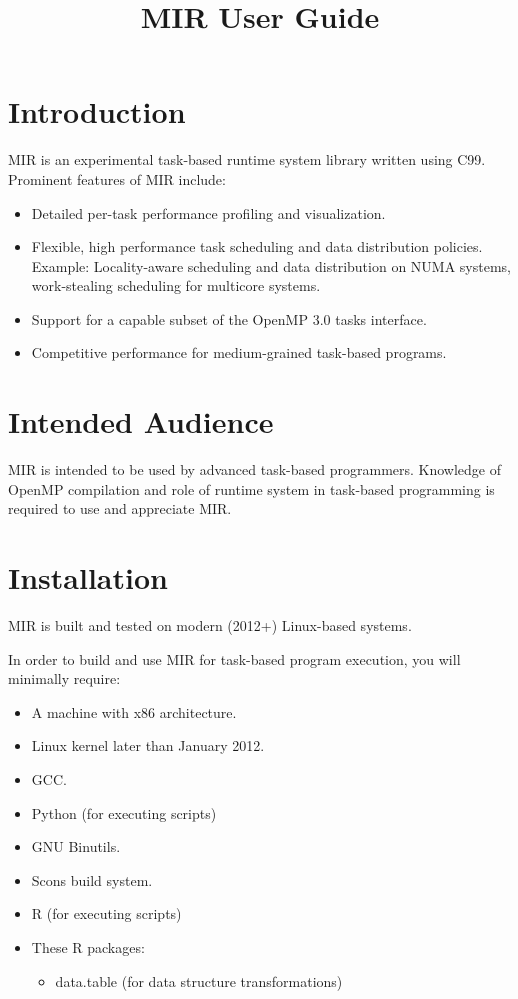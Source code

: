 \documentclass[11pt,a4paper]{article}
\title{MIR User Guide}
\begin{document}
\maketitle

\section{Introduction}\label{introduction}

MIR is an experimental task-based runtime system library written using C99. Prominent features of MIR include:
\begin{itemize}
    \item Detailed per-task performance profiling and visualization.
    \item Flexible, high performance task scheduling and data distribution policies. Example: Locality-aware scheduling and data distribution on NUMA systems, work-stealing scheduling for multicore systems.
    \item Support for a capable subset of the OpenMP 3.0 tasks interface.
    \item Competitive performance for medium-grained task-based programs.
\end{itemize}

\section{Intended Audience}\label{intended-audience}

MIR is intended to be used by advanced task-based programmers. Knowledge of OpenMP compilation and role of runtime system in task-based programming is required to use and appreciate MIR.

\section{Installation}\label{installation}

MIR is built and tested on modern (2012+) Linux-based systems.

In order to build and use MIR for task-based program execution, you will minimally require:

\begin{itemize}
  \item A machine with x86 architecture.
  \item Linux kernel later than January 2012.
  \item GCC.
  \item Python (for executing scripts)
  \item GNU Binutils.
  \item Scons build system.
  \item R (for executing scripts)
  \item These R packages:
  \begin{itemize}
      \item data.table (for data structure transformations)
  \end{itemize}
\end{itemize}
\end{document}
